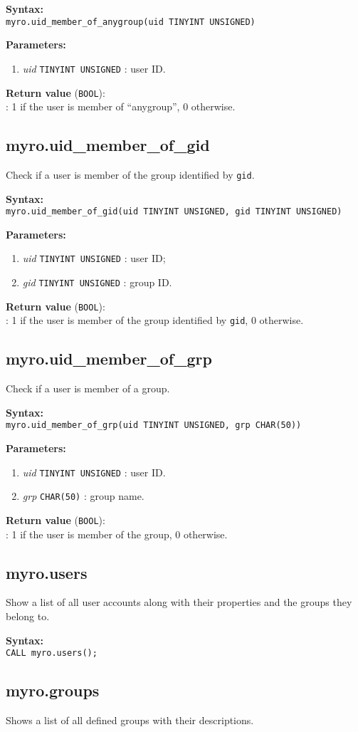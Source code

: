 \documentclass[12pt,titlepage]{article}
\newcommand{\syntax}[1]
{
  \bigskip
  \noindent
  \textbf{Syntax: } \\ 
  \indent \texttt{#1}
}
\newenvironment{parameters}
{
  \bigskip
  \noindent
  \textbf{Parameters:}
  \begin{enumerate}
}
{
  \end{enumerate}
}
\newcommand{\param}[2]
{
  \item \textit{#1} \texttt{#2} 
}
\newcommand{\return}[1]
{
  \bigskip
  \noindent
  \textbf{Return value} (\texttt{#1}): \\
  \indent
}
\begin{document}
\syntax{myro.uid\_member\_of\_anygroup(uid TINYINT UNSIGNED)}

\begin{parameters}
\param{uid}{TINYINT UNSIGNED}: user ID.
\end{parameters}

\return{BOOL}: 1 if the user is member of ``anygroup'', 0 otherwise.

%
\subsection{myro.uid\_member\_of\_gid}
Check if a user is member of the group identified by \verb|gid|.

\syntax{myro.uid\_member\_of\_gid(uid TINYINT UNSIGNED, gid TINYINT UNSIGNED)}

\begin{parameters}
\param{uid}{TINYINT UNSIGNED}: user ID;
\param{gid}{TINYINT UNSIGNED}: group ID.
\end{parameters}

\return{BOOL}: 1 if the user is member of the group identified by \verb|gid|,
0 otherwise.



\subsection{myro.uid\_member\_of\_grp}
Check if a user is member of a group.

\syntax{myro.uid\_member\_of\_grp(uid TINYINT UNSIGNED, grp CHAR(50))}

\begin{parameters}
\param{uid}{TINYINT UNSIGNED}: user ID.
\param{grp}{CHAR(50)}: group name.
\end{parameters}

\return{BOOL}: 1 if the user is member of the group, 0 otherwise.

%
\subsection{myro.users}
Show a list of all user accounts along with their properties and the
groups they belong to.

\syntax{CALL myro.users();}



\subsection{myro.groups}
Shows a list of all defined groups with their descriptions.
\end{document}
